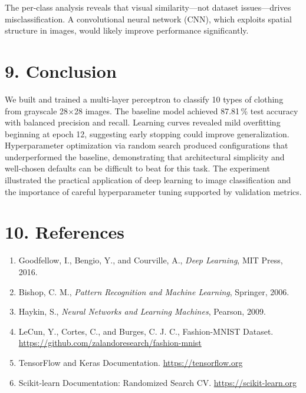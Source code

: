 \documentclass[11pt]{article}
\begin{document}
The per-class analysis reveals that visual similarity—not dataset issues—drives misclassification. A convolutional neural network (CNN), which exploits spatial structure in images, would likely improve performance significantly.

\section*{9. Conclusion}

We built and trained a multi-layer perceptron to classify 10 types of clothing from grayscale 28×28 images. The baseline model achieved 87.81\,\% test accuracy with balanced precision and recall. Learning curves revealed mild overfitting beginning at epoch 12, suggesting early stopping could improve generalization. Hyperparameter optimization via random search produced configurations that underperformed the baseline, demonstrating that architectural simplicity and well-chosen defaults can be difficult to beat for this task. The experiment illustrated the practical application of deep learning to image classification and the importance of careful hyperparameter tuning supported by validation metrics.

\section*{10. References}

\begin{enumerate}
\item Goodfellow, I., Bengio, Y., and Courville, A., \emph{Deep Learning}, MIT Press, 2016.
\item Bishop, C. M., \emph{Pattern Recognition and Machine Learning}, Springer, 2006.
\item Haykin, S., \emph{Neural Networks and Learning Machines}, Pearson, 2009.
\item LeCun, Y., Cortes, C., and Burges, C. J. C., Fashion-MNIST Dataset. \url{https://github.com/zalandoresearch/fashion-mnist}
\item TensorFlow and Keras Documentation. \url{https://tensorflow.org}
\item Scikit-learn Documentation: Randomized Search CV. \url{https://scikit-learn.org}

\end{enumerate}
\end{document}
